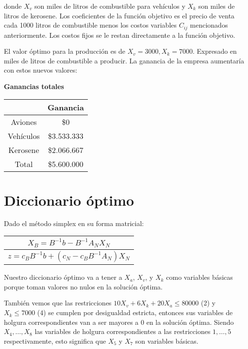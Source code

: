 \documentclass[10pt,a4paper]{article}
\begin{document}
donde $X_v$ son miles de litros de combustible para vehículos y  $X_k$ son miles de litros de kerosene. Los coeficientes de la función objetivo es el precio de venta cada 1000 litros de combustible menos los costos variables $C_{ij}$ mencionados anteriormente. Los costos fijos se le restan directamente a la función objetivo.

El valor óptimo para la producción es de $X_v = 3000, X_k = 7000$. Expresado en miles de litros de combustible a producir. La ganancia de la empresa aumentaría con estos nuevos valores:
\clearpage
\begin{center}
	\textbf{Ganancias totales}
	\vspace{3mm}

	\begin{tabular}{| c | c |}
		\hline
		&           Ganancia    \\
		\hline
		Aviones   & \$0  \\
		\hline
		Vehículos & \$3.533.333 \\
		\hline
		Kerosene  & \$2.066.667 \\
		\hline
		Total     & \$5.600.000\\
		\hline
	\end{tabular}
\end{center}

\section{} %
\section{} %
\section*{Diccionario óptimo}

Dado el método simplex en su forma matricial:
\begin{tabular}{c}
	$X_B = B^{-1}b - B^{-1}A_NX_N$ \\
	\hline
	$z = c_B B^{-1} b + (c_N - c_B B^{-1} A_N) X_N$
\end{tabular}

Nuestro diccionario óptimo va a tener a $X_a$, $X_v$, y $X_k$ como variables básicas porque toman valores no nulos en la solución óptima.

También vemos que las restricciones $10 X_v + 6 X_k + 20 X_a \leq 80000$ (2) y $X_k \leq 7000$ (4) se cumplen por desigualdad estricta, entonces sus variables de holgura correspondientes van a ser mayores a 0 en la solución óptima.
Siendo $X_4, \dots, X_8$ las variables de holgura correspondientes a las restricciones $1, \dots, 5$ respectivamente, esto significa que $X_5$ y $X_7$ son variables básicas.
\end{document}
